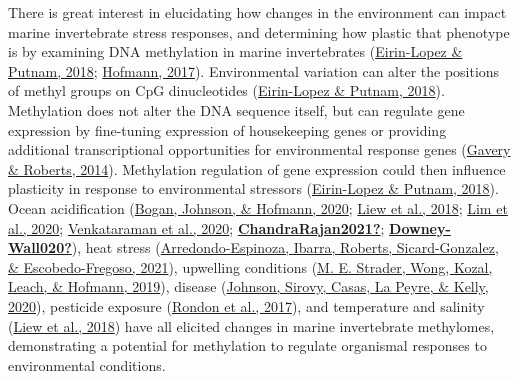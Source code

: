 \documentclass [11pt, proquest] {uwthesis}[2015/03/03]
\begin{document}
There is great interest in elucidating how changes in the environment can impact marine invertebrate stress responses, and determining how plastic that phenotype is by examining DNA methylation in marine invertebrates (\protect\hyperlink{ref-Eirin-Lopez2018}{Eirin-Lopez \& Putnam, 2018}; \protect\hyperlink{ref-Hofmann2017}{Hofmann, 2017}). Environmental variation can alter the positions of methyl groups on CpG dinucleotides (\protect\hyperlink{ref-Eirin-Lopez2018}{Eirin-Lopez \& Putnam, 2018}). Methylation does not alter the DNA sequence itself, but can regulate gene expression by fine-tuning expression of housekeeping genes or providing additional transcriptional opportunities for environmental response genes (\protect\hyperlink{ref-Gavery2014}{Gavery \& Roberts, 2014}). Methylation regulation of gene expression could then influence plasticity in response to environmental stressors (\protect\hyperlink{ref-Eirin-Lopez2018}{Eirin-Lopez \& Putnam, 2018}). Ocean acidification (\protect\hyperlink{ref-Bogan2020}{Bogan, Johnson, \& Hofmann, 2020}; \protect\hyperlink{ref-Liew2018}{Liew et al., 2018}; \protect\hyperlink{ref-Lim2020}{Lim et al., 2020}; \protect\hyperlink{ref-Venkataraman2020}{Venkataraman et al., 2020}; \protect\hyperlink{ref-ChandraRajan2021}{\textbf{ChandraRajan2021?}}; \protect\hyperlink{ref-Downey-Wall020}{\textbf{Downey-Wall020?}}), heat stress (\protect\hyperlink{ref-Arredondo-Espinoza2021}{Arredondo-Espinoza, Ibarra, Roberts, Sicard-Gonzalez, \& Escobedo-Fregoso, 2021}), upwelling conditions (\protect\hyperlink{ref-Strader2019}{M. E. Strader, Wong, Kozal, Leach, \& Hofmann, 2019}), disease (\protect\hyperlink{ref-Johnson2020}{Johnson, Sirovy, Casas, La Peyre, \& Kelly, 2020}), pesticide exposure (\protect\hyperlink{ref-Rondon2017}{Rondon et al., 2017}), and temperature and salinity (\protect\hyperlink{ref-Liew2018}{Liew et al., 2018}) have all elicited changes in marine invertebrate methylomes, demonstrating a potential for methylation to regulate organismal responses to environmental conditions.
\end{document}
